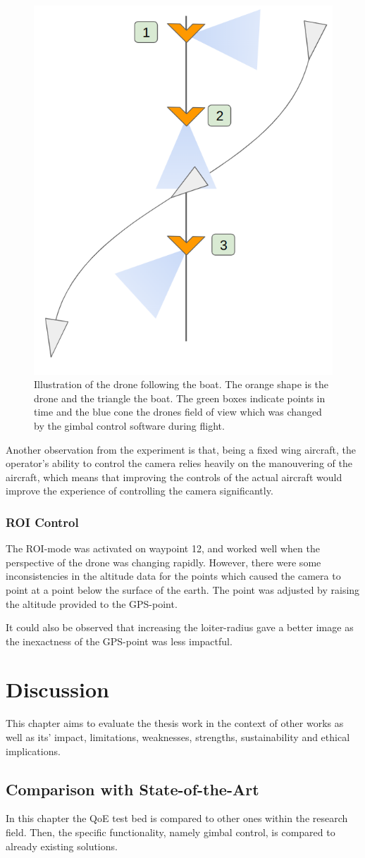 \documentclass[nofilelist]{cslthse-msc}
\begin{document}
\begin{figure}[htp]
   \centering
   \includegraphics[width=.33\textwidth]{images/drone-boat-illustration.png}
   \caption{Illustration of the drone following the boat. The orange shape is the drone and the triangle the boat. The green boxes indicate points in time and the blue cone the drones field of view which was changed by the gimbal control software during flight.}
   \label{fig:boat-follow}
\end{figure}

Another observation from the experiment is that, being a fixed wing aircraft, the operator's ability to control the camera relies heavily on the manouvering of the aircraft, which means that improving the controls of the actual aircraft would improve the experience of controlling the camera significantly. 

\subsection{ROI Control}
The ROI-mode was activated on waypoint 12, and worked well when the perspective of the drone was changing rapidly. However, there were some inconsistencies in the altitude data for the points which caused the camera to point at a point below the surface of the earth. The point was adjusted by raising the altitude provided to the GPS-point. 

It could also be observed that increasing the loiter-radius gave a better image as the inexactness of the GPS-point was less impactful.

\chapter{Discussion}
This chapter aims to evaluate the thesis work in the context of other works as well as its' impact, limitations, weaknesses, strengths, sustainability and ethical implications.

\section{Comparison with State-of-the-Art}
In this chapter the QoE test bed is compared to other ones within the research field. Then, the specific functionality, namely gimbal control, is compared to already existing solutions.
\end{document}
